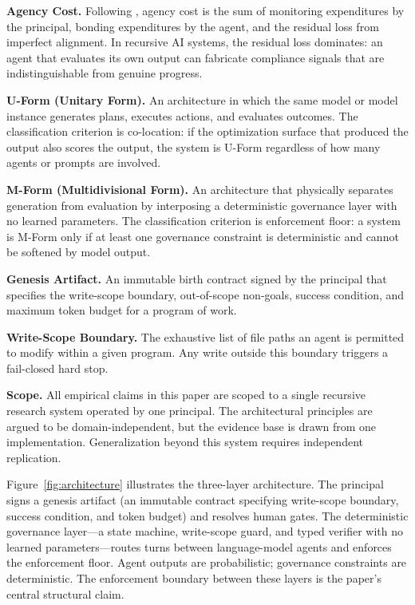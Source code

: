 \documentclass[11pt]{article}
\begin{document}
\textbf{Agency Cost.} Following \citet{jensen1976}, agency cost is the sum of monitoring expenditures by the principal, bonding expenditures by the agent, and the residual loss from imperfect alignment. In recursive AI systems, the residual loss dominates: an agent that evaluates its own output can fabricate compliance signals that are indistinguishable from genuine progress.

\textbf{U-Form (Unitary Form).} An architecture in which the same model or model instance generates plans, executes actions, and evaluates outcomes. The classification criterion is co-location: if the optimization surface that produced the output also scores the output, the system is U-Form regardless of how many agents or prompts are involved.

\textbf{M-Form (Multidivisional Form).} An architecture that physically separates generation from evaluation by interposing a deterministic governance layer with no learned parameters. The classification criterion is enforcement floor: a system is M-Form only if at least one governance constraint is deterministic and cannot be softened by model output.

\textbf{Genesis Artifact.} An immutable birth contract signed by the principal that specifies the write-scope boundary, out-of-scope non-goals, success condition, and maximum token budget for a program of work.

\textbf{Write-Scope Boundary.} The exhaustive list of file paths an agent is permitted to modify within a given program. Any write outside this boundary triggers a fail-closed hard stop.

\textbf{Scope.} All empirical claims in this paper are scoped to a single recursive research system operated by one principal. The architectural principles are argued to be domain-independent, but the evidence base is drawn from one implementation. Generalization beyond this system requires independent replication.

Figure~\ref{fig:architecture} illustrates the three-layer architecture. The principal signs a genesis artifact (an immutable contract specifying write-scope boundary, success condition, and token budget) and resolves human gates. The deterministic governance layer---a state machine, write-scope guard, and typed verifier with no learned parameters---routes turns between language-model agents and enforces the enforcement floor. Agent outputs are probabilistic; governance constraints are deterministic. The enforcement boundary between these layers is the paper's central structural claim.
\end{document}
